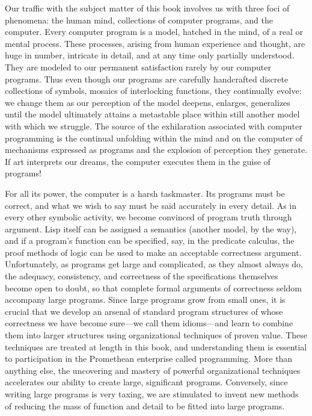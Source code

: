 Our traffic with the subject matter of this book involves us with three foci of
phenomena: the human mind, collections of computer programs, and the computer.
Every computer program is a model, hatched in the mind, of a real or mental
process.  These processes, arising from human experience and thought, are huge
in number, intricate in detail, and at any time only partially understood.
They are modeled to our permanent satisfaction rarely by our computer programs.
Thus even though our programs are carefully handcrafted discrete collections of
symbols, mosaics of interlocking functions, they continually evolve: we change
them as our perception of the model deepens, enlarges, generalizes until the
model ultimately attains a metastable place within still another model with
which we struggle.  The source of the exhilaration associated with computer
programming is the continual unfolding within the mind and on the computer of
mechanisms expressed as programs and the explosion of perception they generate.
If art interprets our dreams, the computer executes them in the guise of
programs!

For all its power, the computer is a harsh taskmaster.  Its programs must be
correct, and what we wish to say must be said accurately in every detail.  As
in every other symbolic activity, we become convinced of program truth through
argument.  Lisp itself can be assigned a semantics (another model, by the way),
and if a program's function can be specified, say, in the predicate calculus,
the proof methods of logic can be used to make an acceptable correctness
argument.  Unfortunately, as programs get large and complicated, as they almost
always do, the adequacy, consistency, and correctness of the specifications
themselves become open to doubt, so that complete formal arguments of
correctness seldom accompany large programs.  Since large programs grow from
small ones, it is crucial that we develop an arsenal of standard program
structures of whose correctness we have become sure---we call them idioms---and
learn to combine them into larger structures using organizational techniques of
proven value.  These techniques are treated at length in this book, and
understanding them is essential to participation in the Promethean enterprise
called programming.  More than anything else, the uncovering and mastery of
powerful organizational techniques accelerates our ability to create large,
significant programs.  Conversely, since writing large programs is very taxing,
we are stimulated to invent new methods of reducing the mass of function and
detail to be fitted into large programs.

